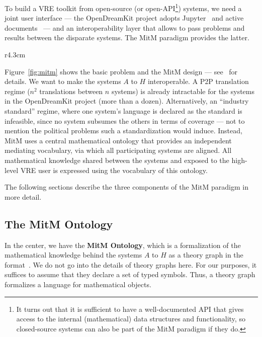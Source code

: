 To build a VRE toolkit from open-source (or open-API\footnote{It turns out that it is
  sufficient to have a well-documented API that gives access to the internal
  (mathematical) data structures and functionality, so closed-source systems can also be
  part of the MitM paradigm if they do.}) systems, we need a joint user interface --- the
OpenDreamKit project adopts Jupyter~\cite{jupyter-project:on} and active
documents~\cite{KohDavGin:psewads11} --- and an interoperability layer that allows to pass
problems and results between the disparate systems. 
The MitM paradigm provides the latter.

\begin{wrapfigure}r{4.3cm}\vspace*{-2em}
  \vspace*{-1em}
  \caption{MitM Paradigm}\label{fig:mitm}\vspace*{-1.5em}
\end{wrapfigure}
Figure~\ref{fig:mitm} shows the basic problem and the MitM design --- see~\cite{DehKohKon:iop16} for details.
We want to make the systems $A$ to $H$ interoperable.
A P2P translation regime ($n^2$ translations between $n$ systems) is already intractable for the systems in the OpenDreamKit project (more than a dozen).
Alternatively, an ``industry standard'' regime, where one system's language is declared as the standard is infeasible, since no system subsumes the others in terms of coverage --- not to mention the political problems such a standardization would induce.
Instead, MitM uses a central mathematical ontology that provides an independent mediating vocabulary, via which all participating systems are aligned.
All mathematical knowledge shared between the systems and exposed to the high-level VRE user is expressed using the vocabulary of this ontology.

The following sections describe the three components of the MitM paradigm in more detail.

\subsection{The MitM Ontology}\label{sec:mitm:recap}

In the center, we have the \textbf{MitM Ontology}, which is a formalization of
the mathematical knowledge behind the systems $A$ to $H$ as a theory graph in
the \OMMT format~\cite{Kohlhase:OMDoc1.2,RabKoh:WSMSML13,uniformal:on}. We do
not go into the details of \OMMT theory graphs here. For our purposes, it
suffices to assume that they declare a set of typed symbols. Thus, a theory
graph formalizes a language for mathematical objects.

